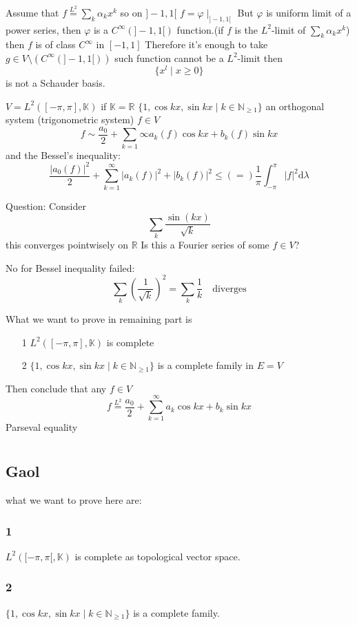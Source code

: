 \documentclass{book}
\newcommand{\abs}[1]{\left\lvert #1 \right\rvert}
\newcommand{\leftbracket}{[}
\newcommand{\rightbracket}{]}
\begin{document}
Assume that $f\stackrel{L^2}{=}\sum\limits_k\alpha_kx^k$ so on $\rightbracket-1,1\leftbracket$ $f=\varphi\mid_{\rightbracket-1,1\leftbracket}$
But $\varphi$ is uniform limit of a power series, then $\varphi$ is a $C^\infty(\rightbracket-1,1\leftbracket)$ function.(if $f$ is the $L^2$-limit of $\sum\limits_k\alpha_kx^k$) then $f$ is of class $C^\infty$ in $\leftbracket-1,1\rightbracket$ Therefore it's enough to take $g\in V\setminus(C^\infty(\rightbracket-1,1\leftbracket))$ such function cannot be a $L^2$-limit then$$\{x^l\mid x\geq 0\}$$ is not a Schauder basis.

$V=L^2([-\pi,\pi],\mathbb{K})$ if $\mathbb{K}=\mathbb{R}$ $\{1,\cos kx,\sin kx\mid k\in \mathbb{N}_{\geq 1}\}$ an orthogonal system (trigonometric system) $f\in V$$$f\sim\frac{a_0}{2}+\sum\limits_{k=1}{\infty}a_k(f)\cos kx+b_k(f)\sin kx$$
and the Bessel's inequality:$$\frac{\abs{a_0(f)}^2}2+\sum\limits_{k=1}^\infty\abs{a_k(f)}^2+\abs{b_k(f)}^2\leq(=)\frac{1}{\pi}\int_{-\pi}^\pi\abs{f}^2\text{d}\lambda$$

Question: Consider $$\sum\limits_k\frac{\sin(kx)}{\sqrt{k}}$$this converges pointwisely on $\mathbb{R}$ Is this a Fourier series of some $f\in V$?

No for Bessel inequality failed:$$\sum\limits_k(\frac{1}{\sqrt{k}})^2=\sum\limits_k\frac{1}k\quad\text{diverges}$$

What we want to prove in remaining part is \begin{itemize}
    \item [1]$L^2([-\pi,\pi],\mathbb{K})$ is complete
    \item[2]$\{1,\cos kx,\sin kx\mid k\in \mathbb{N}_{\geq 1}\}$ is a complete family in $E=V$
\end{itemize}
Then conclude that any $f\in V$ $$f\stackrel{L^2}=\frac{a_0}{2}+\sum\limits_{k=1}^\infty a_k\cos kx+b_k\sin kx$$
Parseval equality
\chapter{}
\section{Gaol}
what we want to prove here are:
\subsection*{1}
$L^2(\leftbracket -\pi,\pi\leftbracket,\mathbb{K})$ is complete as topological vector space.
\subsection*{2}$\{1,\cos kx,\sin kx\mid k\in \mathbb{N}_{\geq 1}\}$ is a complete family.
\end{document}
